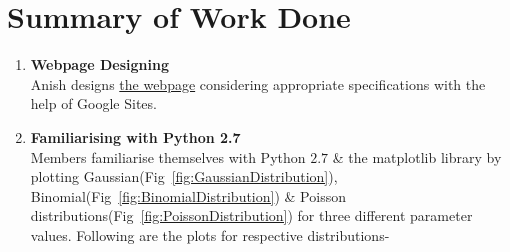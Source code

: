 \documentclass{article}
\begin{document}
\section{Summary of Work Done}
    \begin{enumerate}
        \item \large {\textbf {Webpage Designing}}\\
            Anish designs \href{https://sites.google.com/site/ep219coursegroup/}{the webpage} considering appropriate specifications with the help of Google Sites.
        \item \large {\textbf{Familiarising with Python 2.7}}\\
            Members familiarise themselves with Python $2.7$ \& the matplotlib library by plotting Gaussian(Fig~\ref{fig:GaussianDistribution}), Binomial(Fig~\ref{fig:BinomialDistribution}) \& Poisson distributions(Fig~\ref{fig:PoissonDistribution}) for three different parameter values.
            Following are the plots for respective distributions-
            \begin{figure}[!htb]
\end{figure}
\end{enumerate}
\end{document}
